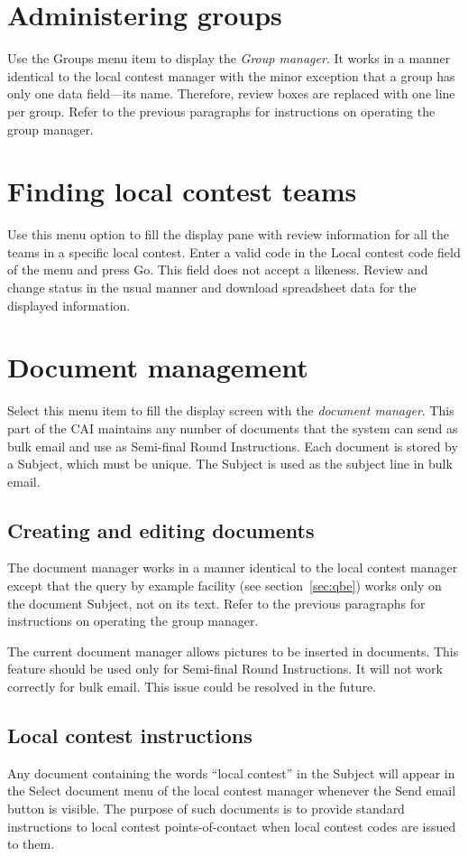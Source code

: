 \documentclass[11pt,letterpaper]{refart}
\def\ui#1{\textsf{#1}}
\begin{document}
\section{Administering groups}
Use the \ui{Groups} menu item to display the \emph{Group manager}. It
works in a manner identical to the local contest manager with the
minor exception that a group has only one data field---its
name. Therefore, review boxes are replaced with one line per
group. Refer to the previous paragraphs for instructions on operating
the group manager.

\section{Finding local contest teams}
Use this menu option to fill the display pane with review information
for all the teams in a specific local contest.  Enter a valid code in
the \ui{Local contest code} field of the menu and press \ui{Go}. This
field does not accept a likeness.  Review and change status in the
usual manner and download spreadsheet data for the displayed
information.

\section{Document management}
\label{sec:documentmanagement}
Select this menu item to fill the display screen with the
\emph{document manager}. This part of the CAI maintains any number of
documents that the system can send as bulk email and use as Semi-final
Round Instructions.  Each document is stored by a Subject, which must
be unique. The Subject is used as the subject line in bulk email.

\subsection{Creating and editing documents}
The document manager works in a manner identical to the local contest
manager except that the query by example facility (see
section~\ref{sec:qbe}) works only on the document Subject, not on its
text. Refer to the previous paragraphs for instructions on operating
the group manager.

The current document manager allows pictures to be inserted in
documents.  This feature should be used only for Semi-final Round
Instructions. It will not work correctly for bulk email. This issue
could be resolved in the future.

\subsection{Local contest instructions}
Any document containing the words ``local contest'' in the Subject
will appear in the \ui{Select document} menu of the local contest
manager whenever the \ui{Send email} button is visible. The purpose of
such documents is to provide standard instructions to local contest
points-of-contact when local contest codes are issued to them.
\end{document}
